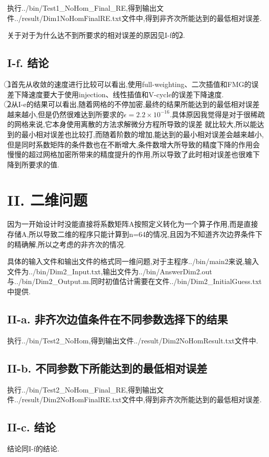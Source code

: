 \documentclass[twoside,a4paper]{article}
\begin{document}
执行../bin/Test1\_NoHom\_Final\_RE,得到输出文件../result/Dim1NoHomFinalRE.txt文件中,得到非齐次所能达到的最低相对误差.

关于对于为什么达不到所要求的相对误差的原因见I-f的\textcircled{2}.

\subsection*{I-f. 结论}
\textcircled{1}首先从收敛的速度进行比较可以看出,使用full-weighting、二次插值和FMG的误差下降速度要大于使用injection、线性插值和V-cycle的误差下降速度.\\[2pt]
\textcircled{2}从I-e的结果可以看出,随着网格的不停加密,最终的结果所能达到的最低相对误差越来越小,但是仍然很难达到所要求的$\epsilon=2.2\times10^{-16}$.具体原因我觉得是对于很稀疏的网格来说,它本身使用离散的方法求解微分方程所导致的误差
就比较大,所以能达到的最小相对误差也比较打,而随着阶数的增加,能达到的最小相对误差会越来越小,但是同时系数矩阵的条件数也在不断增大,条件数增大所导致的精度下降的作用会慢慢的超过网格加密所带来的精度提升的作用,所以导致了此时相对误差也很难下降到所要求的值.

\section*{II. 二维问题}
\hspace{0.9em}
因为一开始设计时没能直接将系数矩阵A按照定义转化为一个算子作用,而是直接存储A,所以导致二维的程序只能计算到n=64的情况,且因为不知道齐次边界条件下的精确解,所以之考虑的非齐次的情况.

具体的输入文件和输出文件的格式同一维问题,对于主程序../bin/main2来说,输入文件为../bin/Dim2\_Input.txt,输出文件为../bin/AnswerDim2.out与../bin/Dim2\_Output.m.同时初值估计需要在文件../bin/Dim2\_InitialGuess.txt中提供.

\subsection*{II-a. 非齐次边值条件在不同参数选择下的结果}
\hspace{0.9em}
执行../bin/Test2\_NoHom,得到输出文件../result/Dim2NoHomResult.txt文件中.

\subsection*{II-b. 不同参数下所能达到的最低相对误差}
\hspace{0.9em}
执行../bin/Test2\_NoHom\_Final\_RE,得到输出文件../result/Dim2NoHomFinalRE.txt文件中,得到非齐次所能达到的最低相对误差.

\subsection*{II-c. 结论}
\hspace{0.9em}
结论同I-f的结论.
\end{document}
